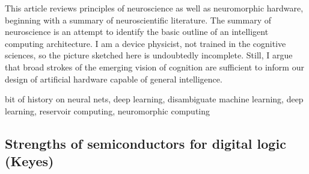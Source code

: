 This article reviews principles of neuroscience as well as neuromorphic hardware, beginning with a summary of neuroscientific literature. The summary of neuroscience is an attempt to identify the basic outline of an intelligent computing architecture. I am a device physicist, not trained in the cognitive sciences, so the picture sketched here is undoubtedly incomplete. Still, I argue that broad strokes of the emerging vision of cognition are sufficient to inform our design of artificial hardware capable of general intelligence. 

\vspace{3em}
bit of history on neural nets, deep learning, disambiguate machine learning, deep learning, reservoir computing, neuromorphic computing

\subsection{\label{sec:keyes}Strengths of semiconductors for digital logic (Keyes)}
\cite{ke1985a,ke1985b}
